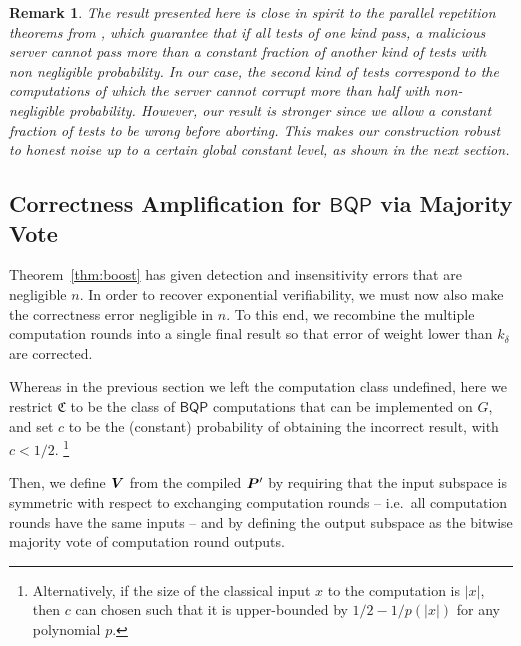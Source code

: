 \documentclass[12pt]{iopart}
\renewcommand{\1}{\mathds{1}}
\newtheorem{remark}{Remark}
\begin{document}
\begin{remark}
The result presented here is close in spirit to the parallel repetition theorems from \cite{B21:secure,ACGH20:non}, which guarantee that if all tests of one kind pass, a malicious server cannot pass more than a constant fraction of another kind of tests with non negligible probability. In our case, the second kind of tests correspond to the computations of which the server cannot corrupt more than half with non-negligible probability. However, our result is stronger since we allow a constant fraction of tests to be wrong before aborting. This makes our construction robust to honest noise up to a certain global constant level, as shown in the next section.
\end{remark}













\subsection{Correctness Amplification for $\mathsf{BQP}$ via Majority Vote}
Theorem~\ref{thm:boost} has given detection and
insensitivity errors that are negligible $n$.
In order to recover exponential verifiability, we must now also make the
correctness error negligible in $n$. To this end, we 
recombine the multiple computation rounds into a single final result
so that error of weight lower than $k_\delta$ are corrected.

Whereas in the previous section we left the computation class undefined, 
here we restrict $\mathfrak C$ to be the class of $\mathsf{BQP}$
computations that can be implemented on $G$, and set $c$ to be the (constant)
probability of obtaining the incorrect result, with $c < 1/2$.
\footnote{Alternatively, if the size of the classical input $x$ to the computation is $|x|$,
then $c$ can chosen such that it is upper-bounded by $1/2 - 1/p(|x|)$ for any polynomial $p$.}

Then, we define $\bm{V}$ from the compiled $\bm{P}'$ by requiring
that the input subspace is symmetric with respect to exchanging
computation rounds -- i.e.~all computation rounds have the same
inputs -- and by defining the output subspace as the
bitwise majority vote of computation round outputs.
\end{document}
